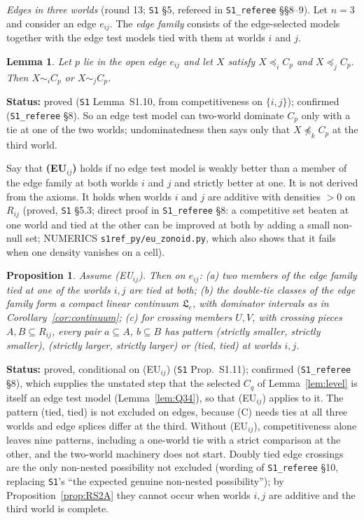 \documentclass[11pt]{article}
\newtheorem{lemma}[theorem]{Lemma}
\newtheorem{proposition}[theorem]{Proposition}
\theoremstyle{definition}
\theoremstyle{remark}
\newcommand{\src}[1]{\texttt{#1}}
\newcommand{\status}[1]{\par\smallskip\noindent\textbf{Status:} #1\par\smallskip}
\begin{document}
\emph{Edges in three worlds} (round 13; \src{S1} \S5, refereed in \src{S1\_referee} \S\S8--9). Let $n=3$ and consider an edge $e_{ij}$. The \emph{edge family} consists of the edge-selected models together with the edge test models tied with them at worlds $i$ and $j$.

\begin{lemma}\label{lem:weakedge}
Let $p$ lie in the open edge $e_{ij}$ and let $X$ satisfy $X\preceq_iC_p$ and $X\preceq_jC_p$. Then $X\sim_iC_p$ or $X\sim_jC_p$.
\end{lemma}
\status{proved (\src{S1} Lemma~S1.10, from competitiveness on $\{i,j\}$); confirmed (\src{S1\_referee} \S8). So an edge test model can two-world dominate $C_p$ only with a tie at one of the two worlds; undominatedness then says only that $X\not\preceq_kC_p$ at the third world.}

Say that \textbf{(EU$_{ij}$)} holds if no edge test model is weakly better than a member of the edge family at both worlds $i$ and $j$ and strictly better at one. It is not derived from the axioms. It holds when worlds $i$ and $j$ are additive with densities $>0$ on $R_{ij}$ (proved, \src{S1} \S5.3; direct proof in \src{S1\_referee} \S8: a competitive set beaten at one world and tied at the other can be improved at both by adding a small non-null set; NUMERICS \src{s1ref\_py/eu\_zonoid.py}, which also shows that it fails when one density vanishes on a cell).

\begin{proposition}\label{prop:S111}
Assume (EU$_{ij}$). Then on $e_{ij}$: (a) two members of the edge family tied at one of the worlds $i,j$ are tied at both; (b) the double-tie classes of the edge family form a compact linear continuum $\mathfrak L_e$, with dominator intervals as in Corollary~\ref{cor:continuum}; (c) for crossing members $U,V$, with crossing pieces $A,B\subseteq R_{ij}$, every pair $a\subseteq A$, $b\subseteq B$ has pattern (strictly smaller, strictly smaller), (strictly larger, strictly larger) or (tied, tied) at worlds $i,j$.
\end{proposition}
\status{proved, conditional on (EU$_{ij}$) (\src{S1} Prop.~S1.11); confirmed (\src{S1\_referee} \S8), which supplies the unstated step that the selected $C_q$ of Lemma~\ref{lem:level} is itself an edge test model (Lemma~\ref{lem:Q34}), so that (EU$_{ij}$) applies to it. The pattern (tied, tied) is not excluded on edges, because (C) needs ties at all three worlds and edge splices differ at the third. Without (EU$_{ij}$), competitiveness alone leaves nine patterns, including a one-world tie with a strict comparison at the other, and the two-world machinery does not start. Doubly tied edge crossings are the only non-nested possibility not excluded (wording of \src{S1\_referee} \S10, replacing \src{S1}'s ``the expected genuine non-nested possibility''); by Proposition~\ref{prop:RS2A} they cannot occur when worlds $i,j$ are additive and the third world is complete.}
\end{document}
